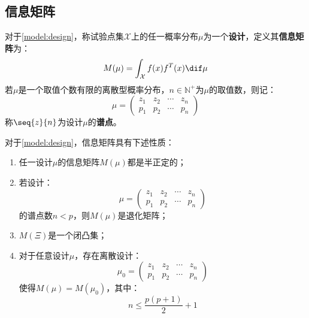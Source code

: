 \subsection{信息矩阵}
\begin{definition}
	对于\cref{model:design}，称试验点集$\mathcal{X}$上的任一概率分布$\mu$为一个\textbf{设计}，定义其\textbf{信息矩阵}为：
	\begin{equation*}
		M(\mu)=\int_{\mathcal{X}}f(x)f^T(x)\dif\mu
	\end{equation*}
	若$\mu$是一个取值个数有限的离散型概率分布，$n\in\mathbb{N}^+$为$\mu$的取值数，则记：
	\begin{equation*}
		\mu=
		\begin{pmatrix}
			z_1 & z_2 & \cdots & z_n \\
			p_1 & p_2 & \cdots & p_n
		\end{pmatrix}
	\end{equation*}
	称$\seq{z}{n}$为设计$\mu$的\textbf{谱点}。
\end{definition}
\begin{property}
	对于\cref{model:design}，信息矩阵具有下述性质：
	\begin{enumerate}
		\item 任一设计$\mu$的信息矩阵$M(\mu)$都是半正定的；
		\item 若设计：
		\begin{equation*}
			\mu=
			\begin{pmatrix}
				z_1 & z_2 & \cdots & z_n \\
				p_1 & p_2 & \cdots & p_n
			\end{pmatrix}
		\end{equation*}
		的谱点数$n<p$，则$M(\mu)$是退化矩阵；
		\item $M(\Xi)$是一个闭凸集；
		\item 对于任意设计$\mu$，存在离散设计：
		\begin{equation*}
			\mu_0=
			\begin{pmatrix}
				z_1 & z_2 & \cdots & z_n \\
				p_1 & p_2 & \cdots & p_n
			\end{pmatrix}
		\end{equation*}
		使得$M(\mu)=M(\mu_0)$，其中：
		\begin{equation*}
			n\leqslant\frac{p(p+1)}{2}+1
		\end{equation*}
	\end{enumerate}
\end{property}
